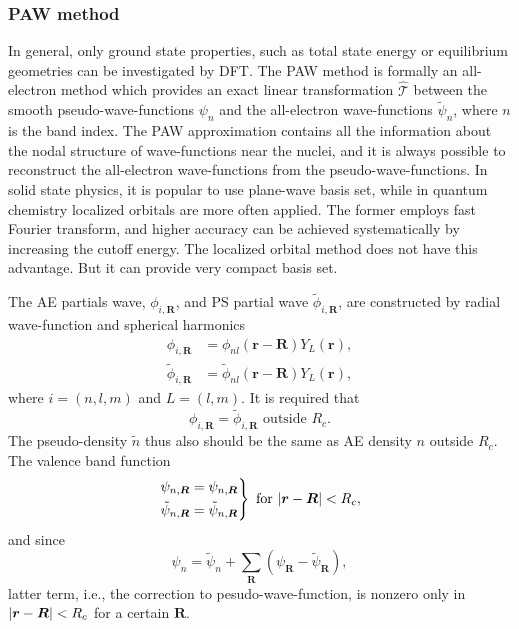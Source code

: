 
\subsubsection{PAW method}
\label{sssec:paw}

In general, only ground state properties, such as total state energy or
equilibrium geometries can be investigated by DFT.\cite{Enkovaara:2010jd}
The PAW method is formally an all-electron method which provides an exact linear
transformation
$\hat{\mathcal{T}}$
between the smooth pseudo-wave-functions $\psi_n$ and the
all-electron wave-functions $\tilde{\psi}_n$, where $n$ is the band index.
The PAW approximation contains all the information about the nodal structure of
wave-functions near the nuclei, and it is always possible to reconstruct the
all-electron wave-functions from the pseudo-wave-functions.
In solid state physics, it is popular to use plane-wave basis set, while in
quantum chemistry localized orbitals are more often applied.
The former employs fast Fourier transform, and higher accuracy can be achieved
systematically by increasing the cutoff energy. The localized orbital method does
not have this advantage. But it can provide very compact basis set.

The AE partials wave, $\phi_{i, \bm{R}}$, and PS partial wave $\tilde{\phi}_{i, \bm{R}}$,
are constructed by radial wave-function and spherical harmonics
\begin{align}
	\phi_{i, \bm{R}}         & = \phi_{nl} (\bm{r} - \bm{R}) Y_L(\bm{r}),         \\
	\tilde{\phi}_{i, \bm{R}} & = \tilde{\phi}_{nl} (\bm{r} - \bm{R}) Y_L(\bm{r}),
	\label{eq:tildephi}
\end{align}
where $i = (n, l, m)$ and $L = (l, m)$.\cite{Mortensen:2005ep}
It is required that
\begin{equation}
	\phi_{i, \bm{R}} = \tilde{\phi}_{i, \bm{R}} \text{ outside } R_c.
\end{equation}
The pseudo-density $\tilde{n}$ thus also should be the same as AE density
$n$ outside $R_c$.
The valence band function
\begin{equation}
	\begin{rcases}
		\psi_{n, \bm{R}} = \psi_{n, \bm{R}} \\
		\tilde{\psi}_{n, \bm{R}} = \tilde{\psi}_{n, \bm{R}}
	\end{rcases}
  \text{ for } \abs{\bm{r} - \bm{R}} < R_c,
\end{equation}
and since
\begin{equation}
  \psi_n = \tilde{\psi}_n + \sum_{\bm{R}} (\psi_{\bm{R}} - \tilde{\psi}_{\bm{R}}),
\end{equation}
latter term, i.e.,
the correction to pesudo-wave-function,
is nonzero only in $\abs{\bm{r} - \bm{R}} < R_c$
for a certain $\bm{R}$.

